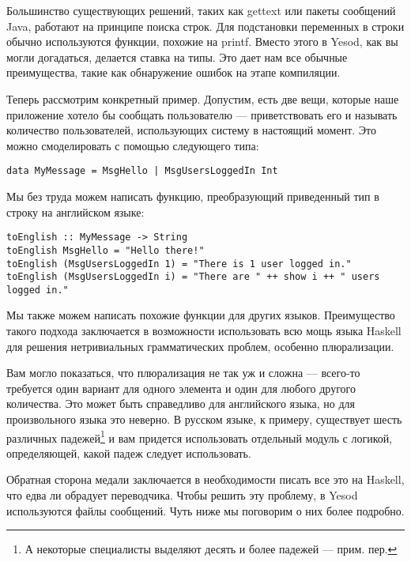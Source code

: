 Большинство существующих решений, таких как gettext или пакеты сообщений Java, работают на принципе поиска строк. Для подстановки переменных в строки обычно используются функции, похожие на printf. Вместо этого в Yesod, как вы могли догадаться, делается ставка на типы. Это дает нам все обычные преимущества, такие как обнаружение ошибок на этапе компиляции.

Теперь рассмотрим конкретный пример. Допустим, есть две вещи, которые наше приложение хотело бы сообщать пользователю --- приветствовать его и называть количество пользователей, использующих систему в настоящий момент. Это можно смоделировать с помощью следующего типа:

\begin{lstlisting}
data MyMessage = MsgHello | MsgUsersLoggedIn Int
\end{lstlisting}

Мы без труда можем написать функцию, преобразующий приведенный тип в строку на английском языке:

\begin{lstlisting}
toEnglish :: MyMessage -> String
toEnglish MsgHello = "Hello there!"
toEnglish (MsgUsersLoggedIn 1) = "There is 1 user logged in."
toEnglish (MsgUsersLoggedIn i) = "There are " ++ show i ++ " users logged in."
\end{lstlisting}

Мы также можем написать похожие функции для других языков. Преимущество такого подхода заключается в возможности использовать всю мощь языка Haskell для решения нетривиальных грамматических проблем, особенно плюрализации. %

\begin{remark}
Вам могло показаться, что плюрализация не так уж и сложна --- всего-то требуется один вариант для одного элемента и один для любого другого количества. Это может быть справедливо для английского языка, но для произвольного языка это неверно. В русском языке, к примеру, существует шесть различных падежей\footnote{А некоторые специалисты выделяют десять и более падежей --- прим. пер.} и вам придется использовать отдельный модуль с логикой, определяющей, какой падеж следует использовать.
\end{remark}

Обратная сторона медали заключается в необходимости писать все это на Haskell, что едва ли обрадует переводчика. Чтобы решить эту проблему, в Yesod используются файлы сообщений. Чуть ниже мы поговорим о них более подробно. %

